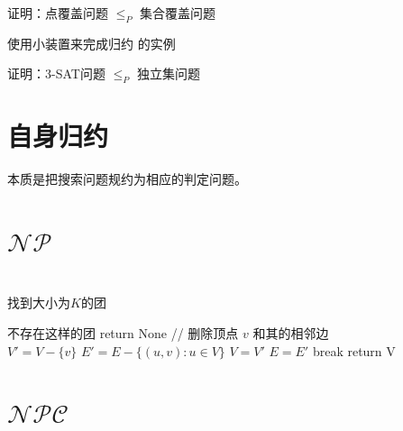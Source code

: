 \documentclass[]{article}
\begin{document}
证明：点覆盖问题 $ \leq_P $ 集合覆盖问题

使用小装置来完成归约 的实例

证明：3-SAT问题 $ \leq_P $ 独立集问题



\section{自身归约}

本质是把搜索问题规约为相应的判定问题。


\section{$\mathcal{NP}$}

\section{}
	
\begin{algorithm}[H]
	\caption{找到大小为$ K $的团}
	{
		不存在这样的团\;	
		return None\;	
	}
	{
		// 删除顶点 $ v $ 和其的相邻边\\
		$ V' = V - \{ v\} $\;
		$ E' = E - \{(u, v):u \in V\} $\;
		{
			$ V = V' $\;
			$ E = E' $\;
		}
		{
			break\;
		}
	}
	return V \;
\end{algorithm}

\section{$ \mathcal{NPC}$}

\section{}
\end{document}
